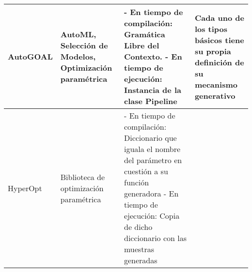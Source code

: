 \begin{longtable}{  p{2.5cm}  p{4cm}  p{6.8cm}  p{6.5cm} }
    AutoGOAL                                                                                                                                                                                                                                                                                                                                                      &
    AutoML, Selección de Modelos, Optimización paramétrica                                                                                                                                                                                                                                                                                                        &
    - En tiempo de compilación: Gramática Libre del Contexto. \newline- En tiempo de ejecución: Instancia de la clase Pipeline                                                                                                                                                                                                                                    &
    Cada uno de los tipos básicos tiene su propia definición de su mecanismo generativo                                                                                                                                                                                                                                                                             \\
    \hline
    HyperOpt                                                                                                                                                                                                                                                                                                                                                      &
    Biblioteca de optimización paramétrica                                                                                                                                                                                                                                                                                                                        &
    - En tiempo de compilación: Diccionario que iguala el nombre del parámetro en cuestión a su función generadora \newline- En tiempo de ejecución: Copia de dicho diccionario con las muestras generadas                                                                                                                                                        &

\end{longtable}
